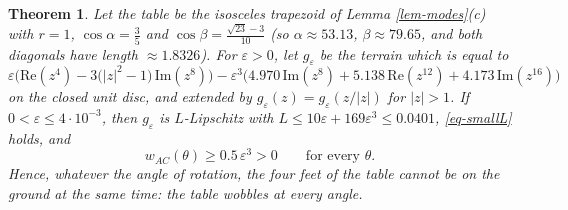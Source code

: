 \documentclass[a4paper,11pt,twoside,leqno]{article}
\newtheorem{teo}{Theorem}[section]
\newcommand{\eps}[0]{\varepsilon}
\numberwithin{equation}{section}
\begin{document}
\begin{teo}\label{teo-cex}
Let the table be the isosceles trapezoid of Lemma \ref{lem-modes}(c) with $r = 1$, $\cos\alpha = \frac{3}{5}$ and $\cos\beta = \frac{\sqrt{23}-3}{10}$ (so $\alpha \approx 53.13$\textdegree{}, $\beta \approx 79.65$\textdegree{}, and both diagonals have length $\approx 1.8326$). For $\eps > 0$, let $g_\eps$ be the terrain which is equal to
\[
\eps\Big( \mathrm{Re}(z^4) - 3\big(|z|^2 - 1\big)\, \mathrm{Im}(z^8) \Big) - \eps^3 \Big( 4.970\, \mathrm{Im}(z^8) + 5.138\, \mathrm{Re}(z^{12}) + 4.173\, \mathrm{Im}(z^{16}) \Big)
\]
on the closed unit disc, and extended by $g_\eps(z) = g_\eps(z/|z|)$ for $|z| > 1$. If $0 < \eps \leq 4 \cdot 10^{-3}$, then $g_\eps$ is $L$-Lipschitz with $L \leq 10\eps + 169\eps^3 \leq 0.0401$, \eqref{eq-smallL} holds, and
\[
w_{AC}(\theta) \geq 0.5\, \eps^3 > 0 \qquad \text{for every } \theta.
\]
Hence, whatever the angle of rotation, the four feet of the table cannot be on the ground at the same time: the table wobbles at every angle.
\end{teo}
\end{document}

